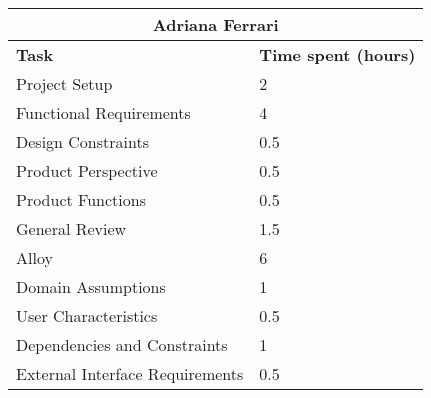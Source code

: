 \begin{table}[h]
  \center
  \begin{tabular}{l|l}
    \multicolumn{2}{c}{\textbf{Adriana Ferrari}} \\
    \hline
    \textbf{Task} & \textbf{Time spent (hours)}\\
    \hline
    Project Setup & 2 \\
    Functional Requirements & 4 \\
    Design Constraints & 0.5 \\
    Product Perspective & 0.5 \\
    Product Functions & 0.5 \\
    General Review & 1.5 \\
    Alloy & 6 \\
    Domain Assumptions & 1 \\
    User Characteristics & 0.5 \\
    Dependencies and Constraints & 1 \\
    External Interface Requirements & 0.5 \\
  \end{tabular}
\end{table}